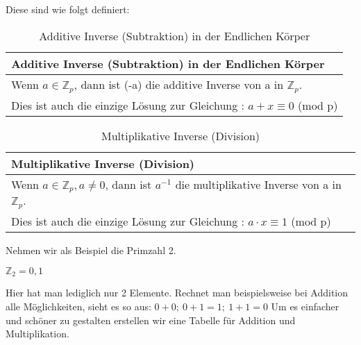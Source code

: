 Diese sind wie folgt definiert:
\begin{table}[!ht]
    \centering
        \begin{tabular}{l}
            \toprule
            \textbf{Additive Inverse (Subtraktion) in der Endlichen Körper}\\
            \midrule
                Wenn $a \in \mathbb{Z}_p$, dann ist (-a) die additive Inverse von a in $\mathbb{Z}_p$.\\
                Dies ist auch die einzige Lösung zur Gleichung : $a + x \equiv 0$ (mod p) \\
            \bottomrule
        \end{tabular}
        \caption{Additive Inverse (Subtraktion) in der Endlichen Körper}
        \label{tab3}
    \end{table}
    \begin{table}[!ht]
        \centering
            \begin{tabular}{l}
                \toprule
                \textbf{Multiplikative Inverse (Division)}\\
                \midrule
                Wenn $a \in \mathbb{Z}_p, a \neq 0 $,  dann ist $a^{-1}$ die multiplikative Inverse von a in $\mathbb{Z}_p$.\\
                Dies ist auch die einzige Lösung zur Gleichung : $a \cdot x \equiv 1$ (mod p)\\
                \bottomrule    
            \end{tabular}
            \caption{Multiplikative Inverse (Division)}
            \label{tab3}
        \end{table}
    

Nehmen wir als Beispiel die Primzahl 2.

$ \mathbb{Z}_2 = {0,1} $

Hier hat man lediglich nur 2 Elemente. Rechnet man beispielsweise bei Addition alle Möglichkeiten, sieht es so aus: $0 + 0;\ 0 + 1 = 1;\ 1 + 1 = 0$ 
Um es einfacher und schöner zu gestalten erstellen wir eine Tabelle für Addition und Multiplikation.


